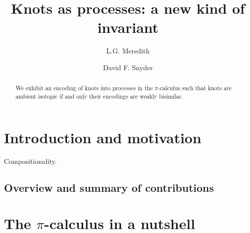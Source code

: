 \documentclass[]{llncs}
\begin{document}
\title{Knots as processes: a new kind of invariant}

\author{ L.G. Meredith \and David F. Snyder }

\maketitle              %


\begin{abstract}

          We exhibit an encoding of knots into processes in the
          $\pi$-calculus such that knots are ambient isotopic if and
          only their encodings are weakly bisimilar.

\end{abstract}



\section{Introduction and motivation}

Compositionality.

\subsection{Overview and summary of contributions}

\section{The $\pi$-calculus in a nutshell}
\end{document}
